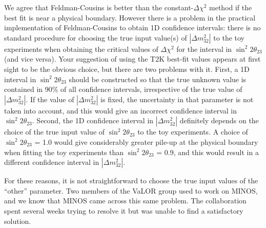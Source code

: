 \begin{enumerate}
We agree that Feldman-Cousins is better than the constant-$\Delta \chi^{2}$ method if the best fit is near a physical boundary. 
However there is a problem in the practical implementation of Feldman-Cousins to obtain 1D confidence intervals: there is no 
standard procedure for choosing the true input value(s) of $|\Delta m^{2}_{32}|$ to the toy experiments when obtaining the 
critical values of $\Delta \chi^{2}$ for the interval in $\sin^{2} 2 \theta_{23}$ (and vice versa). Your suggestion of using 
the T2K best-fit values appears at first sight to be the obvious choice, but there are two problems with it. First, a 1D interval 
in $\sin^{2} 2 \theta_{23}$ should be constructed so that the true unknown value is contained in 90\% of all confidence intervals, 
irrespective of the true value of $|\Delta m^{2}_{32}|$. If the value of $|\Delta m^{2}_{32}|$ is fixed, the uncertainty in that 
parameter is not taken into account, and this would give an incorrect confidence interval in $\sin^{2} 2 \theta_{23}$. Second, the 
1D confidence interval in $|\Delta m^{2}_{32}|$ definitely depends on the choice of the true input value of $\sin^{2} 2 \theta_{23}$ 
to the toy experiments. A choice of $\sin^{2} 2 \theta_{23}$ = 1.0 would give considerably greater pile-up at the physical boundary 
when fitting the toy experiments than $\sin^{2} 2 \theta_{23}$ = 0.9, and this would result in a different confidence interval in 
$|\Delta m^{2}_{32}|$.

For these reasons, it is not straightforward to choose the true input values of the ``other'' parameter. Two members of the VaLOR 
group used to work on MINOS, and we know that MINOS came across this same problem. The collaboration spent several weeks trying to 
resolve it but was unable to find a satisfactory solution.
\end{enumerate}
